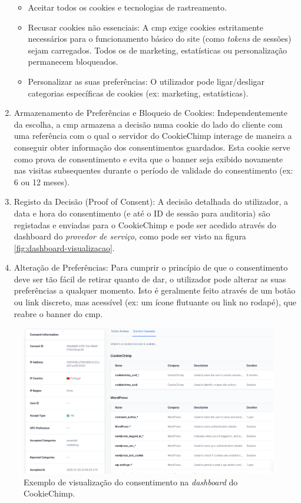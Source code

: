 \begin{enumerate}
    \begin{itemize}
        \item Aceitar todos os cookies e tecnologias de rastreamento.
        \item Recusar cookies não essenciais: A \acrshort{cmp} exige cookies estritamente necessários para o funcionamento básico do site (como \textit{tokens} de sessões) sejam carregados. Todos os de marketing, estatísticas ou personalização permanecem bloqueados.
        \item Personalizar as suas preferências: O utilizador pode ligar/desligar categorias específicas de cookies (ex: marketing, estatísticas).
    \end{itemize}
    \item Armazenamento de Preferências e Bloqueio de Cookies: Independentemente da escolha, a \acrshort{cmp} armazena a decisão numa cookie do lado do cliente com uma referência com o qual o servidor do CookieChimp interage de maneira a conseguir obter informação dos consentimentos guardados. Esta cookie serve como prova de consentimento e evita que o banner seja exibido novamente nas visitas subsequentes durante o período de validade do consentimento (ex: 6 ou 12 meses).
    \item Registo da Decisão (Proof of Consent): A decisão detalhada do utilizador, a data e hora do consentimento (e até o ID de sessão para auditoria) são registadas e enviadas para o CookieChimp e pode ser acedido através do dashboard do \textit{provedor de serviço}, como pode ser visto na figura \ref{fig:dashboard-visualizacao}.
    \item Alteração de Preferências: Para cumprir o princípio de que o consentimento deve ser tão fácil de retirar quanto de dar, o utilizador pode alterar as suas preferências a qualquer momento. Isto é geralmente feito através de um botão ou link discreto, mas acessível (ex: um ícone flutuante ou link no rodapé), que reabre o banner do \acrshort{cmp}.
\end{enumerate}


\label{fig:dashboard-visualizacao}
\begin{figure}[h]
    \begin{center}
	\includegraphics[width=1.0\textwidth]{images/consent.png}
    \end{center}
    \caption{Exemplo de visualização do consentimento na \textit{dashboard} do CookieChimp.}
\end{figure}

